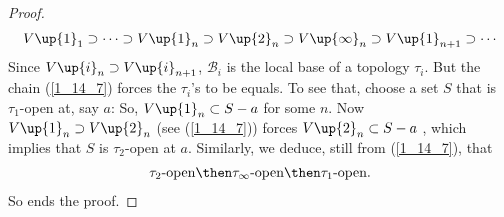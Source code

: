 \begin{proof}
\begin{align}
    V\up{1}_1 
      \supset
    \cdots 
      \supset 
    V\up{1}_n
      \supset 
    V\up{2}_n 
      \supset 
    V\up{\infty}_n 
      \supset 
    V\up{1}_{n+1} 
      \supset 
    \cdots
  \end{align}
%
Since 
  $V\up{i}_n\supset V\up{i}_{n+1}$, 
$\mathscr{B}_i$ is the local base of a topology $\tau_i$. 
But the chain (\ref{1_14_7}) forces the $\tau_i$'s to be equals. 
To see that, choose a set $S$ that is $\tau_1$-open at, say $a$: So, 
%
  $V\up{1}_n \subset S-a$  
%
for some $n$. Now $V\up{1}_n \supset V\up{2}_n$ (see (\ref{1_14_7})) forces  
%
  $V\up{2}_n \subset S-a$ , 
%
which implies that $S$ is $\tau_2$-open at $a$.
Similarly, we deduce, still from (\ref{1_14_7}), that 
\begin{align}
  \tau_2\text{-open} 
    \then 
  \tau_\infty\text{-open} 
    \then 
  \tau_1\text{-open}.
\end{align}
So ends the proof.
\end{proof}





